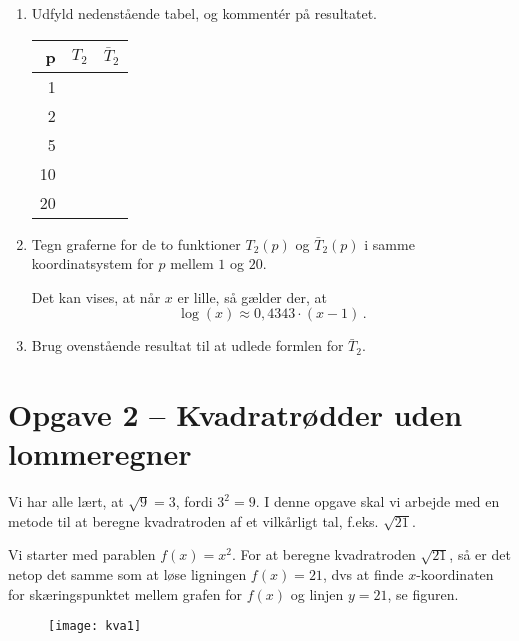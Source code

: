 \documentclass[12pt,oneside,a4paper]{article}
\theoremstyle{plain}
\begin{document}
\begin{enumerate}[label=(\alph*), resume]
    \item Udfyld nedenstående tabel, og kommentér på resultatet.
        \begin{center}
            \begin{tabular}{|r|c|l|}
\hline
                p & $T_2$ & $\bar T_2$ \\
                \hline
                1 & & \\
                \hline
                2 & & \\
                \hline
                5 & & \\
                \hline
                10 & & \\
                \hline
                20 & & \\
                \hline
            \end{tabular}
        \end{center}

    \item Tegn graferne for de to funktioner $T_2(p)$ og $\bar T_2(p)$ i samme koordinatsystem for $p$ mellem $1$ og $20$.

Det kan vises, at når $x$ er lille, så gælder der, at
        \[
            \log(x) \approx 0,4343 \cdot (x-1) \,.
        \]

    \item Brug ovenstående resultat til at udlede formlen for $\bar T_2$.

\end{enumerate}


\section*{Opgave 2 -- Kvadratrødder uden lommeregner}
Vi har alle lært, at $\sqrt{9} = 3$, fordi $3^2 = 9$. I denne opgave skal vi
arbejde med en metode til at beregne kvadratroden af et vilkårligt tal, f.eks.
$\sqrt{21}$.

Vi starter med parablen $f(x) = x^2$. For at beregne kvadratroden $\sqrt{21}$,
så er det netop det samme som at løse ligningen $f(x) = 21$, dvs at finde
$x$-koordinaten for skæringspunktet mellem grafen for $f(x)$ og linjen $y=21$,
se figuren.

\begin{figure}[ht]
    \centering
    \texttt{[image: kva1]}
    \caption{}
    \label{fig1}
\end{figure}
\end{document}
